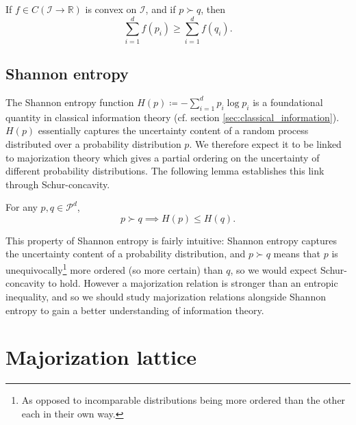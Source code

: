 \begin{lemma} \label{lem:karamata}
    If $f \in C(\mathcal{I} \to \mathbb{R})$ is convex on $\mathcal{I}$, and if $p \succ q$, then
    \begin{equation}
        \sum_{i=1}^{d} f(p_i) \geq \sum_{i=1}^{d} f(q_i).
    \end{equation}
\end{lemma}

\subsection{Shannon entropy} \label{sec:schur_shannon}

The Shannon entropy function $H(p) \coloneqq - \sum_{i = 1}^{d} p_i \log p_i$ is a foundational quantity in classical information theory (cf. section \ref{sec:classical_information}). $H(p)$ essentially captures the uncertainty content of a random process distributed over a probability distribution $p$. We therefore expect it to be linked to majorization theory which gives a partial ordering on the uncertainty of different probability distributions. The following lemma establishes this link through Schur-concavity.

\begin{lemma}
    For any $p, q \in \mathcal{P}^d$,
    \begin{equation}
        p \succ q \implies  H(p) \leq H(q).
    \end{equation}
\end{lemma}

This property of Shannon entropy is fairly intuitive: Shannon entropy captures the uncertainty content of a probability distribution, and $p \succ q$ means that $p$ is unequivocally\footnote{As opposed to incomparable distributions being more ordered than the other each in their own way.} more ordered (so more certain) than $q$, so we would expect Schur-concavity to hold. However a majorization relation is stronger than an entropic inequality, and so we should study majorization relations alongside Shannon entropy to gain a better understanding of information theory.



\section{Majorization lattice} \label{sec:majorization_lattice}

